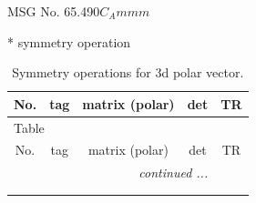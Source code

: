 \documentclass[fleqn,8pt]{jsarticle}
\begin{document}
\setcounter{MaxMatrixCols}{32}

\renewcommand{\tablename}{Table~}
\renewcommand{\figurename}{Figure~}
\begin{center}
\LARGE
MSG No. 65.490\quad$C_{A}mmm$
\end{center}
* symmetry operation
\renewcommand{\arraystretch}{1.3}
\begin{longtable}{ccccc}
\caption{Symmetry operations for 3d polar vector.}
 \\
 \hline \hline
No. & tag & matrix (polar) & det & TR \\ \hline \endfirsthead

\multicolumn{4}{l}{\tablename\ \thetable{}} \\
 \hline \hline
No. & tag & matrix (polar) & det & TR \\ \hline \endhead

 \hline \hline
\multicolumn{4}{r}{\footnotesize\it continued ...} \\ \endfoot

 \hline \hline
\multicolumn{4}{r}{} \\ \endlastfoot


\end{longtable}
\end{document}
